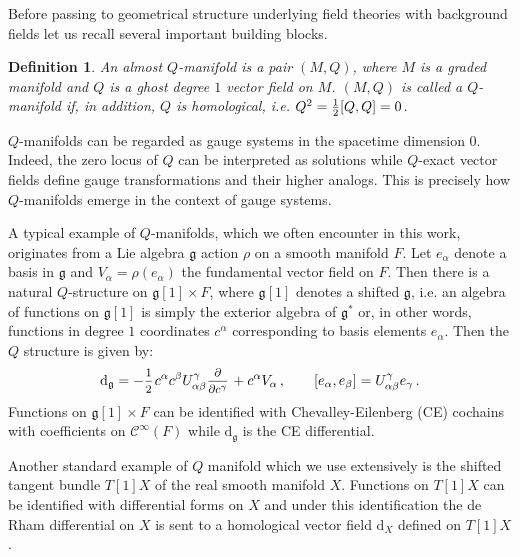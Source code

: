 \documentclass[a4paper,12pt]{article}
\numberwithin{equation}{section} %
\newtheorem{definition}[thm]{Definition}
\newcommand{\dx}{\mathrm{d}_X}
\renewcommand{\d}{\partial}
\newcommand{\commut}[2]{[#1{,}\,#2]}
\newcommand{\half}{\mathchoice{%
    \ffrac{1}{2}}{\frac{1}{2}}{\frac{1}{2}}{\frac{1}{2}}}
\newcommand{\ffrac}[2]{\raisebox{.5pt}%
  {\footnotesize$\displaystyle\frac{#1}{#2}$}\kern1pt}
\newcommand{\dl}[1]{\mathchoice{\ffrac{\d}{\d #1}}{\frac{\d}{\d #1}}{\ffrac{\d}{\d #1}}{\ffrac{\d}{\d #1}}}
\newcommand{\Liealg}{\mathfrak}
\newcommand{\algg}{\Liealg{g}}
\newcommand{\cC}{\mathcal{C}}
\newcommand{\dg}{\mathrm{d}_\algg}
\begin{document}
Before passing to geometrical structure underlying field theories with background fields let us recall several important building blocks.
\begin{definition}
An almost $Q$-manifold is a pair $(M,Q)$, where $M$ is a graded manifold and $Q$ is a ghost degree $1$ vector field on $M$. $(M,Q)$ is called a $Q$-manifold if, in addition, $Q$ is homological, i.e. $Q^2=\half\commut{Q}{Q}=0$.
\end{definition}

$Q$-manifolds can be regarded as gauge systems in the spacetime dimension $0$. Indeed, the zero locus of $Q$ can be interpreted as solutions
while $Q$-exact vector fields define gauge transformations and their higher analogs. This is precisely how $Q$-manifolds emerge in the context of gauge systems.

A typical example of $Q$-manifolds, which we often encounter in this work, originates from a Lie algebra $\algg$ action $\rho$ on a smooth manifold $F$. Let $e_\alpha$ denote a basis in $\algg$ and $V_\alpha=\rho(e_\alpha)$ the fundamental vector field on $F$. Then there is a natural $Q$-structure on $\algg[1]\times F$, where $\algg[1]$ denotes a shifted $\algg$, i.e. an algebra of functions on $\algg[1]$ is simply the exterior algebra of $\algg^*$ or, in other words, functions in degree $1$ coordinates $c^\alpha$ corresponding to basis elements $e_\alpha$. Then the $Q$ structure is given by:
\begin{equation}
\label{CEdiff}
\dg=-\half c^\alpha c^\beta U_{\alpha\beta}^\gamma \dl{c^\gamma}+c^\alpha V_\alpha\,, \qquad \commut{e_\alpha}{e_\beta}=U_{\alpha\beta}^\gamma  e_\gamma\,.
\end{equation}
Functions on $\algg[1]\times F$ can be identified with Chevalley-Eilenberg (CE) cochains with coefficients on $\cC^\infty(F)$ while $\dg$ is the CE differential. 

Another standard example of $Q$ manifold which we use extensively is the shifted tangent bundle  $T[1]X$  of the real smooth manifold $X$. Functions on $T[1]X$ can be identified with differential forms on $X$ and under this identification the de Rham differential on $X$ is sent to a homological vector field $\dx$ defined on $T[1]X$. 
\end{document}
